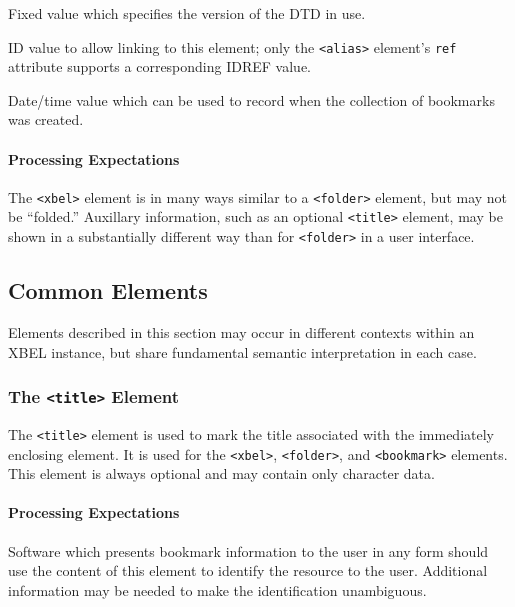 \documentclass{howto}
\newcommand{\element}[1]{\texttt{<#1>}}
\newcommand{\attribute}[1]{\texttt{#1}}
\begin{document}
        \begin{definitions}
          \term{\attribute{version}, \emph{fixed}}
          Fixed value which specifies the version of the DTD in use.

          \term{\attribute{id}}
          ID value to allow linking to this element; only the
          \element{alias} element's \attribute{ref} attribute supports
          a corresponding IDREF value.

          \term{\attribute{added}}
          Date/time value which can be used to record when the
          collection of bookmarks was created.
	\end{definitions}

      \paragraph*{Processing Expectations}
        The \element{xbel} element is in many ways similar to a
        \element{folder} element, but may not be ``folded.''
        Auxillary information, such as an optional \element{title}
        element, may be shown in a substantially different way than
        for \element{folder} in a user interface.

  \subsection{Common Elements
              \label{common-elements}}

    Elements described in this section may occur in different contexts
    within an XBEL instance, but share fundamental semantic
    interpretation in each case.

    \subsubsection{The \element{title} Element
                   \label{element-title}}

      The \element{title} element is used to mark the title associated
      with the immediately enclosing element.  It is used for
      the \element{xbel}, \element{folder}, and \element{bookmark}
      elements.  This element is always optional and may contain
      only character data.

      \paragraph*{Processing Expectations}
        Software which presents bookmark information to the user in
        any form should use the content of this element to identify
        the resource to the user.  Additional information may be
        needed to make the identification unambiguous.
\end{document}
